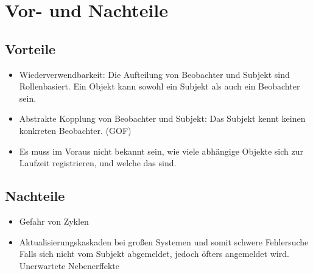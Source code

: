 \section{Vor- und Nachteile}

\subsection{Vorteile}
\begin{itemize}
\item Wiederverwendbarkeit: Die Aufteilung von Beobachter und Subjekt sind Rollenbasiert. Ein Objekt kann sowohl ein Subjekt als auch ein Beobachter sein.
\item Abstrakte Kopplung von Beobachter und Subjekt: Das Subjekt kennt keinen konkreten Beobachter. (GOF) 
\item Es muss im Voraus nicht bekannt sein, wie viele abhängige Objekte sich zur Laufzeit registrieren, und welche das sind.
\end{itemize}
\subsection{Nachteile}
\begin{itemize}
\item Gefahr von Zyklen
\item Aktualisierungskaskaden bei großen Systemen und somit schwere Fehlersuche
Falls sich nicht vom Subjekt abgemeldet, jedoch öfters angemeldet wird. Unerwartete Nebenerffekte
\end{itemize}
